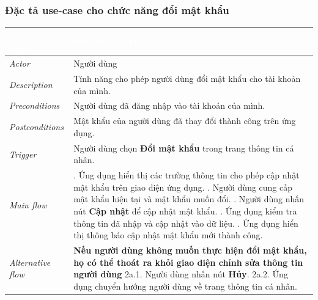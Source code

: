 \subsubsection{Đặc tả use-case cho chức năng đổi mật khẩu}
\begin{center}
    \arrayrulewidth=2pt
    \begin{longtable}{
        |>{\raggedright\arraybackslash}p{3cm}
        |>{\raggedright\arraybackslash}p{13cm}
        |}
        \hline
        \rowcolor{cyan!75!black} \textcolor{white}{\textbf{Use-case name}} & \textcolor{white}{\textbf{ĐỔI MẬT KHẨU}}
        \\\hline
        \rowcolor{cyan!10!white} \textit{Actor} & Người dùng
        \\\hdashline
        \rowcolor{cyan!10!white} \textit{Description} & Tính năng cho phép người dùng đổi mật khẩu cho tài khoản của mình.
        \\\hdashline
        \rowcolor{cyan!10!white} \textit{Preconditions} & Người dùng đã đăng nhập vào tài khoản của mình.
        \\\hdashline
        \rowcolor{cyan!10!white} \textit{Postconditions} & Mật khẩu của người dùng đã thay đổi thành công trên ứng dụng.
        \\\hdashline
        \rowcolor{cyan!10!white} \textit{Trigger} & Người dùng chọn \textbf{Đổi mật khẩu} trong trang thông tin cá nhân.
        \\\hdashline
        \rowcolor{cyan!10!white} \textit{Main flow} &
        1. Ứng dụng hiển thị các trường thông tin cho phép cập nhật mật khẩu trên giao diện ứng dụng. \newline
        2. Người dùng cung cấp mật khẩu hiện tại và mật khẩu muốn đổi. \newline
        3. Người dùng nhấn nút \textbf{Cập nhật} để cập nhật mật khẩu. \newline
        4. Ứng dụng kiểm tra thông tin đã nhập và cập nhật vào dữ liệu. \newline
        5. Ứng dụng hiển thị thông báo cập nhật mật khẩu mới thành công.
        \\\hdashline
        \rowcolor{cyan!10!white} \textit{Alternative flow} &
        \textbf{Nếu người dùng không muốn thực hiện đổi mật khẩu, họ có thể thoát ra khỏi giao diện chỉnh sửa thông tin người dùng} \newline
        2a.1. Người dùng nhấn nút \textbf{Hủy}. \newline
        2a.2. Ứng dụng chuyển hướng người dùng về trang thông tin cá nhân.

\end{longtable}
\end{center}
